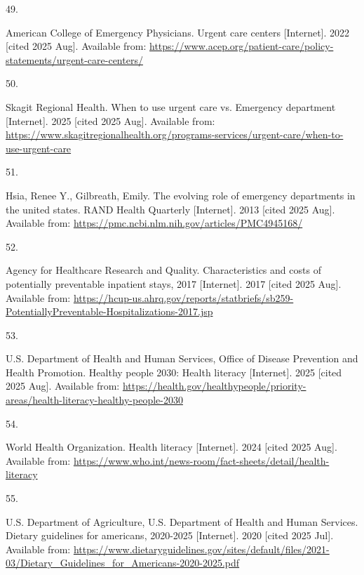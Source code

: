 \documentclass[
  english,
  letterpaper,
]{report}
\newlength{\cslhangindent}
\newlength{\csllabelwidth}
\newenvironment{CSLReferences}[2] %
 {\begin{list}{}{%
  \setlength{\itemindent}{0pt}
  \setlength{\leftmargin}{0pt}
  \setlength{\parsep}{0pt}
  \ifodd #1
   \setlength{\leftmargin}{\cslhangindent}
   \setlength{\itemindent}{-1\cslhangindent}
  \fi
  \setlength{\itemsep}{#2\baselineskip}}}
 {\end{list}}
\newcommand{\CSLLeftMargin}[1]{\parbox[t]{\csllabelwidth}{\strut#1\strut}}
\newcommand{\CSLRightInline}[1]{\parbox[t]{\linewidth - \csllabelwidth}{\strut#1\strut}}
\begin{document}
\begin{CSLReferences}{0}{1}
\CSLLeftMargin{49. }%
\CSLRightInline{American College of Emergency Physicians. Urgent care
centers {[}Internet{]}. 2022 {[}cited 2025 Aug{]}. Available from:
\url{https://www.acep.org/patient-care/policy-statements/urgent-care-centers/}}

\CSLLeftMargin{50. }%
\CSLRightInline{Skagit Regional Health. When to use urgent care vs.
Emergency department {[}Internet{]}. 2025 {[}cited 2025 Aug{]}.
Available from:
\url{https://www.skagitregionalhealth.org/programs-services/urgent-care/when-to-use-urgent-care}}

\CSLLeftMargin{51. }%
\CSLRightInline{Hsia, Renee Y., Gilbreath, Emily. The evolving role of
emergency departments in the united states. RAND Health Quarterly
{[}Internet{]}. 2013 {[}cited 2025 Aug{]}. Available from:
\url{https://pmc.ncbi.nlm.nih.gov/articles/PMC4945168/}}

\CSLLeftMargin{52. }%
\CSLRightInline{Agency for Healthcare Research and Quality.
Characteristics and costs of potentially preventable inpatient stays,
2017 {[}Internet{]}. 2017 {[}cited 2025 Aug{]}. Available from:
\url{https://hcup-us.ahrq.gov/reports/statbriefs/sb259-PotentiallyPreventable-Hospitalizations-2017.jsp}}

\CSLLeftMargin{53. }%
\CSLRightInline{U.S. Department of Health and Human Services, Office of
Disease Prevention and Health Promotion. Healthy people 2030: Health
literacy {[}Internet{]}. 2025 {[}cited 2025 Aug{]}. Available from:
\url{https://health.gov/healthypeople/priority-areas/health-literacy-healthy-people-2030}}

\CSLLeftMargin{54. }%
\CSLRightInline{World Health Organization. Health literacy
{[}Internet{]}. 2024 {[}cited 2025 Aug{]}. Available from:
\url{https://www.who.int/news-room/fact-sheets/detail/health-literacy}}

\CSLLeftMargin{55. }%
\CSLRightInline{U.S. Department of Agriculture, U.S. Department of
Health and Human Services. Dietary guidelines for americans, 2020-2025
{[}Internet{]}. 2020 {[}cited 2025 Jul{]}. Available from:
\url{https://www.dietaryguidelines.gov/sites/default/files/2021-03/Dietary_Guidelines_for_Americans-2020-2025.pdf}}


\end{CSLReferences}
\end{document}
